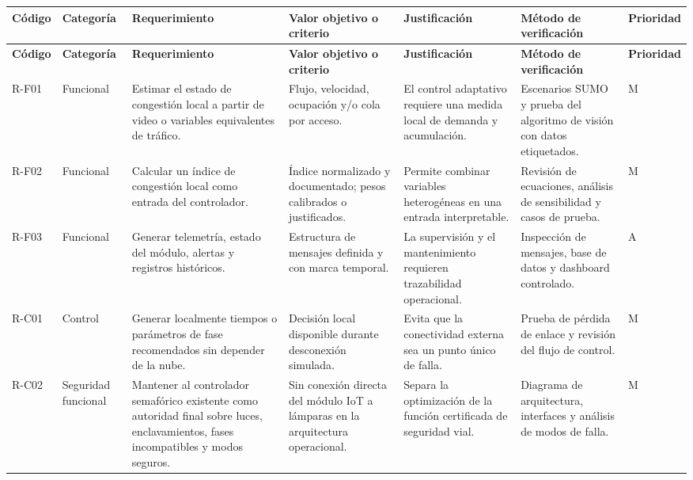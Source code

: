 \documentclass[12pt,a4paper,oneside]{report}
\begin{document}
\begin{landscape}
\footnotesize
{}
\label{tbl:req-verificables}
\begin{longtable}{@{}p{1.15cm}p{1.65cm}p{5.25cm}p{3.15cm}p{4.35cm}p{3.65cm}p{1.25cm}@{}}
\toprule
\textbf{Código} & \textbf{Categoría} & \textbf{Requerimiento} & \textbf{Valor objetivo o criterio} & \textbf{Justificación} & \textbf{Método de verificación} & \textbf{Prioridad}\\
\midrule
\endfirsthead
\toprule
\textbf{Código} & \textbf{Categoría} & \textbf{Requerimiento} & \textbf{Valor objetivo o criterio} & \textbf{Justificación} & \textbf{Método de verificación} & \textbf{Prioridad}\\
\midrule
\endhead
\bottomrule
\endfoot
R-F01 & Funcional & Estimar el estado de congestión local a partir de video o variables equivalentes de tráfico. & Flujo, velocidad, ocupación y/o cola por acceso. & El control adaptativo requiere una medida local de demanda y acumulación. & Escenarios SUMO y prueba del algoritmo de visión con datos etiquetados. & M\\
R-F02 & Funcional & Calcular un índice de congestión local como entrada del controlador. & Índice normalizado y documentado; pesos calibrados o justificados. & Permite combinar variables heterogéneas en una entrada interpretable. & Revisión de ecuaciones, análisis de sensibilidad y casos de prueba. & M\\
R-F03 & Funcional & Generar telemetría, estado del módulo, alertas y registros históricos. & Estructura de mensajes definida y con marca temporal. & La supervisión y el mantenimiento requieren trazabilidad operacional. & Inspección de mensajes, base de datos y dashboard controlado. & A\\
R-C01 & Control & Generar localmente tiempos o parámetros de fase recomendados sin depender de la nube. & Decisión local disponible durante desconexión simulada. & Evita que la conectividad externa sea un punto único de falla. & Prueba de pérdida de enlace y revisión del flujo de control. & M\\
R-C02 & Seguridad funcional & Mantener al controlador semafórico existente como autoridad final sobre luces, enclavamientos, fases incompatibles y modos seguros. & Sin conexión directa del módulo IoT a lámparas en la arquitectura operacional. & Separa la optimización de la función certificada de seguridad vial. & Diagrama de arquitectura, interfaces y análisis de modos de falla. & M\\

\end{longtable}
\end{landscape}
\end{document}
